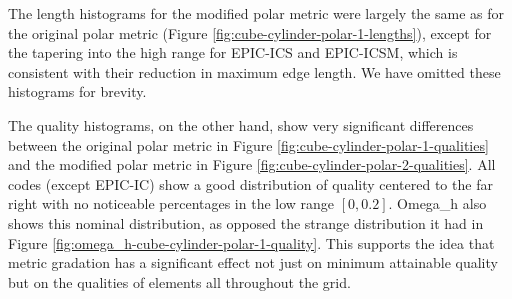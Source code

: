 \documentclass[3p,times,procedia,number]{elsarticle}
\begin{document}
The length histograms for the modified polar metric were largely the
same as for the original polar metric
(Figure \ref{fig:cube-cylinder-polar-1-lengths}),
except for the tapering into the high range for EPIC-ICS and EPIC-ICSM,
which is consistent with their reduction in maximum edge length.
We have omitted these histograms for brevity.


The quality histograms, on the other hand, show very significant differences
between the original polar metric in Figure \ref{fig:cube-cylinder-polar-1-qualities}
and the modified polar metric in Figure \ref{fig:cube-cylinder-polar-2-qualities}.
All codes (except EPIC-IC) show a good distribution of quality centered to the
far right with no noticeable percentages in the low range $[0,0.2]$.
Omega\_h also shows this nominal distribution, as opposed the strange distribution
it had in Figure \ref{fig:omega_h-cube-cylinder-polar-1-quality}.
This supports the idea that metric gradation has a significant effect not just
on minimum attainable quality but on the qualities of elements all throughout the grid.
\end{document}
